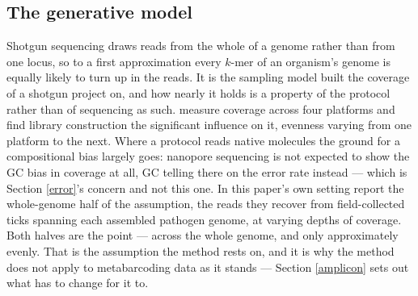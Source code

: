 \documentclass[pdflatex,sn-vancouver-num]{sn-jnl}
\begin{document}
    \subsection{The generative model}\label{model}
    Shotgun sequencing draws reads from the whole of a genome rather than from one locus, so to a
    first approximation every $k$-mer of an organism's genome is equally likely to turn up in the
    reads. It is the sampling model \citet{landerwaterman} built the coverage of a shotgun project
    on, and how nearly it holds is a property of the protocol rather than of sequencing as such.
    \citet{ross2013bias} measure coverage across four platforms and find library construction the
    significant influence on it, evenness varying from one platform to the next. Where a protocol
    reads native molecules the ground for a compositional bias largely goes: nanopore sequencing is
    not expected to show the GC bias in coverage at all, GC telling there on the error rate instead
    \citep{ontbias} --- which is Section \ref{error}'s concern and not this one. In this paper's own
    setting \citet{nanoporeticks} report the whole-genome half of the assumption, the reads they
    recover from field-collected ticks spanning each assembled pathogen genome, at varying depths of
    coverage. Both halves are the point --- across the whole genome, and only approximately evenly.
    That is the assumption the method rests on, and it is why the method does not apply to
    metabarcoding data as it stands --- Section \ref{amplicon} sets out what has to change for it to.
\end{document}

